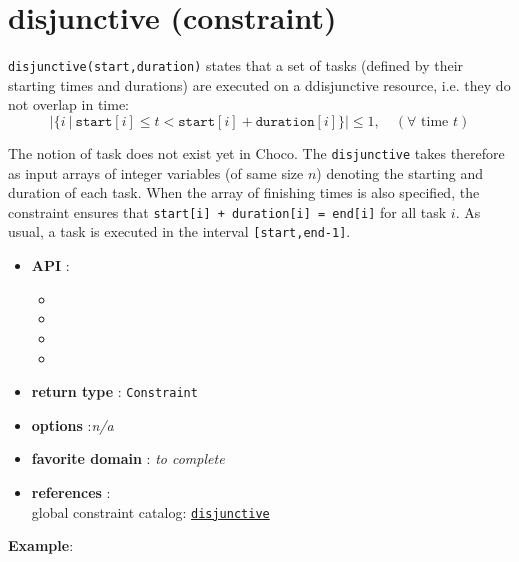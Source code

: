 \label{disjunctive}
\hypertarget{disjunctive}{}

\section{disjunctive (constraint)}\label{disjunctive:disjunctiveconstraint}\hypertarget{disjunctive:disjunctiveconstraint}{}

\begin{notedef}
  \texttt{disjunctive(start,duration)} states that a set of tasks (defined by their starting times and durations) are executed on a ddisjunctive resource, i.e. they do not overlap in time:
$$|\{i\ |\ \mathtt{start}[i]\le t < \mathtt{start}[i]+\mathtt{duration}[i]\}| \le 1,\quad (\forall \text{ time } t)$$
\end{notedef}

The notion of task does not exist yet in Choco. The \texttt{disjunctive} takes therefore as input arrays of integer variables (of same size $n$) denoting the starting and duration of each task. When the array of finishing times is also specified, the constraint ensures that \texttt{start[i] + duration[i] = end[i]} for all task $i$.
As usual, a task is executed in the interval \texttt{[start,end-1]}.

\begin{itemize}
	\item \textbf{API} :
	\begin{itemize}
		\item {}
		\item {}
		\item {}
		\item {}
	\end{itemize}
	\item \textbf{return type} : \texttt{Constraint}
	\item \textbf{options} :\emph{n/a}
	\item \textbf{favorite domain} : \emph{to complete}
	\item \textbf{references} :\\
      global constraint catalog: \href{http://www.emn.fr/x-info/sdemasse/gccat/Cdisjunctive.html}{\tt disjunctive}
\end{itemize}

\textbf{Example}:

